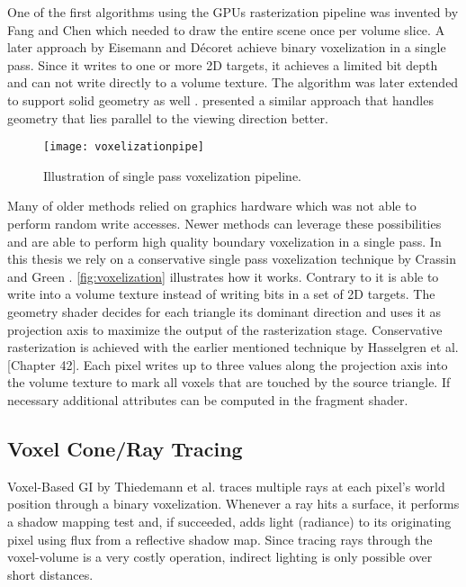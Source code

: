 \documentclass[thesis.tex]{subfiles}
\begin{document}

One of the first algorithms using the GPUs rasterization pipeline was invented by Fang and Chen \cite{bib:fangvoxelization} which needed to draw the entire scene once per volume slice.
A later approach by Eisemann and D{\'e}coret \cite{bib:eisemann:boundaryvox} achieve binary voxelization in a single pass.
Since it writes to one or more 2D targets, it achieves a limited bit depth and can not write directly to a volume texture.
The algorithm was later extended to support solid geometry as well \cite{bib:eisemann:solidvox}. 
\cite{bib:dong:voxelization} presented a similar approach that handles geometry that lies parallel to the viewing direction better. 

\begin{figure}[h]
\centering
\texttt{[image: voxelizationpipe]}
\caption{\cite{bib:openglinsightsvoxel} Illustration of single pass voxelization pipeline. }
\label{fig:voxelization}
\end{figure}
Many of older methods relied on graphics hardware which was not able to perform random write accesses.
Newer methods can leverage these possibilities and are able to perform high quality boundary voxelization in a single pass.
In this thesis we rely on a conservative single pass voxelization technique by Crassin and Green \cite{bib:openglinsightsvoxel}.
\autoref{fig:voxelization} illustrates how it works.
Contrary to \cite{bib:eisemann:boundaryvox} it is able to write into a volume texture instead of writing bits in a set of 2D targets.
The geometry shader decides for each triangle its dominant direction and uses it as projection axis to maximize the output of the rasterization stage.
Conservative rasterization is achieved with the earlier mentioned technique by Hasselgren et al. \cite{bib:GPUGems2}[Chapter 42]. 
Each pixel writes up to three values along the projection axis into the volume texture to mark all voxels that are touched by the source triangle.
If necessary additional attributes can be computed in the fragment shader.

\subsection{Voxel Cone/Ray Tracing} \label{sec:prev:voxelcone}
Voxel-Based GI by Thiedemann et al. \cite{bib:voxelgi} traces multiple rays at each pixel's world position through a binary voxelization.
Whenever a ray hits a surface, it performs a shadow mapping test and, if succeeded, adds light (radiance) to its originating pixel using flux from a reflective shadow map.
Since tracing rays through the voxel-volume is a very costly operation, indirect lighting is only possible over short distances.
\end{document}
